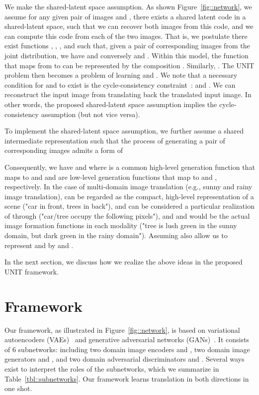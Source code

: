 \documentclass{article}
\begin{document}
We make the shared-latent space assumption. As shown Figure~\ref{fig::network}, we assume for any given pair of images  and , there exists a shared latent code  in a shared-latent space, such that we can recover both images from this code, and we can compute this code from each of the two images. That is, we postulate there exist functions , , , and  such that, given a pair of corresponding images  from the joint distribution, we have  and conversely  and . Within this model, the function  that maps from  to  can be represented by the composition . Similarly, . The UNIT problem then becomes a problem of learning  and . We note that a necessary condition for  and  to exist is the cycle-consistency constraint~\cite{zhu2017unpaired,kim2017learning}:  and . We can reconstruct the input image from translating back the translated input image. In other words, the proposed shared-latent space assumption implies the cycle-consistency assumption (but not vice versa).


To implement the shared-latent space assumption, we further assume a shared intermediate representation  such that the process of generating a pair of corresponding images admits a form of 

Consequently, we have  and  where  is a common high-level generation function that maps  to  and  and  are low-level generation functions that map  to  and , respectively. In the case of multi-domain image translation (e.g., sunny and rainy image translation),  can be regarded as the compact, high-level representation of a scene ("car in front, trees in back"), and  can be considered a particular realization of  through  ("car/tree occupy the following pixels"), and  and  would be the actual image formation functions in each modality ("tree is lush green in the sunny domain, but dark green in the rainy domain"). Assuming  also allow us to represent  and  by  and . 


In the next section, we discuss how we realize the above ideas in the proposed UNIT framework.

\section{Framework}

Our framework, as illustrated in Figure~\ref{fig::network}, is based on variational autoencoders (VAEs)~\cite{kingma2013auto,rezende2014stochastic,larsen2015autoencoding} and generative adversarial networks (GANs)~\cite{goodfellow2014generative,liu2016coupled}. It consists of 6 subnetworks: including two domain image encoders  and , two domain image generators  and , and two domain adversarial discriminators  and . Several ways exist to interpret the roles of the subnetworks, which we summarize in Table~\ref{tbl::subnetworks}. Our framework learns translation in both directions in one shot. 
\end{document}
